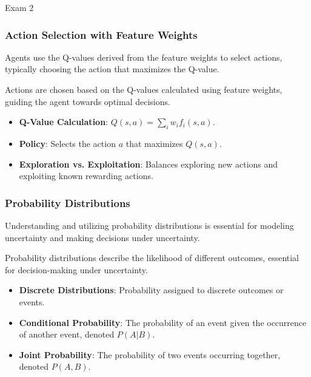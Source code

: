 \begin{examnotes}{Exam 2}
    \subsubsection*{Action Selection with Feature Weights}
    
    Agents use the Q-values derived from the feature weights to select actions, typically choosing the action that maximizes the Q-value.
    
    \begin{highlight}
        Actions are chosen based on the Q-values calculated using feature weights, guiding the agent towards optimal decisions.
        
        \begin{itemize}
            \item \textbf{Q-Value Calculation}: $Q(s, a) = \sum_i w_i f_i(s, a)$.
            \item \textbf{Policy}: Selects the action $a$ that maximizes $Q(s, a)$.
            \item \textbf{Exploration vs. Exploitation}: Balances exploring new actions and exploiting known rewarding actions.
        \end{itemize}
    \end{highlight}
    
    \subsubsection*{Probability Distributions}
    
    Understanding and utilizing probability distributions is essential for modeling uncertainty and making decisions under uncertainty.
    
    \begin{highlight}
        Probability distributions describe the likelihood of different outcomes, essential for decision-making under uncertainty.
        
        \begin{itemize}
            \item \textbf{Discrete Distributions}: Probability assigned to discrete outcomes or events.
            \item \textbf{Conditional Probability}: The probability of an event given the occurrence of another event, denoted $P(A | B)$.
            \item \textbf{Joint Probability}: The probability of two events occurring together, denoted $P(A, B)$.
        \end{itemize}
    \end{highlight}
    

\end{examnotes}
